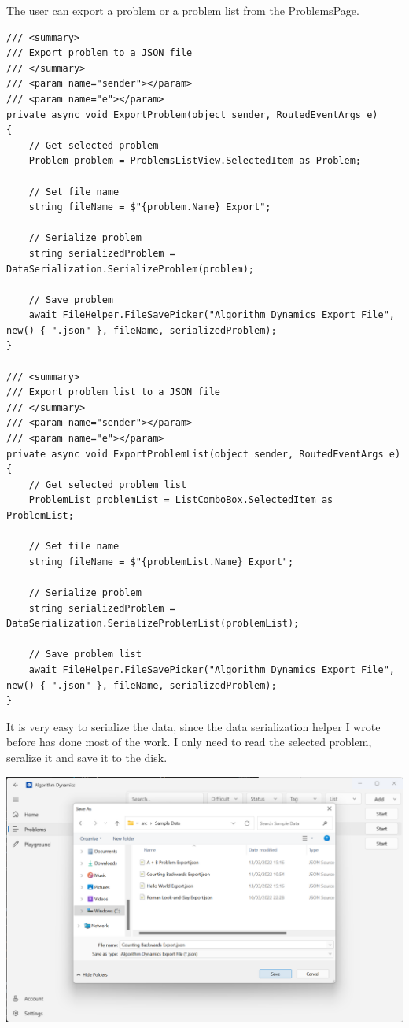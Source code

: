 \documentclass[a4paper]{report}
\begin{document}
The user can export a problem or a problem list from the ProblemsPage.

\begin{verbatim}
/// <summary>
/// Export problem to a JSON file
/// </summary>
/// <param name="sender"></param>
/// <param name="e"></param>
private async void ExportProblem(object sender, RoutedEventArgs e)
{
    // Get selected problem
    Problem problem = ProblemsListView.SelectedItem as Problem;
    
    // Set file name
    string fileName = $"{problem.Name} Export";
    
    // Serialize problem
    string serializedProblem = DataSerialization.SerializeProblem(problem);
    
    // Save problem
    await FileHelper.FileSavePicker("Algorithm Dynamics Export File", new() { ".json" }, fileName, serializedProblem);
}

/// <summary>
/// Export problem list to a JSON file
/// </summary>
/// <param name="sender"></param>
/// <param name="e"></param>
private async void ExportProblemList(object sender, RoutedEventArgs e)
{
    // Get selected problem list
    ProblemList problemList = ListComboBox.SelectedItem as ProblemList;
    
    // Set file name
    string fileName = $"{problemList.Name} Export";
    
    // Serialize problem
    string serializedProblem = DataSerialization.SerializeProblemList(problemList);
    
    // Save problem list
    await FileHelper.FileSavePicker("Algorithm Dynamics Export File", new() { ".json" }, fileName, serializedProblem);
}
\end{verbatim}

It is very easy to serialize the data, since the data serialization helper I wrote before has done most of the work. I only need to read the selected problem, seralize it and save it to the disk.

\includegraphics[width=\textwidth, height=\textheight, keepaspectratio]{ProblemsPage-Export}
\end{document}
